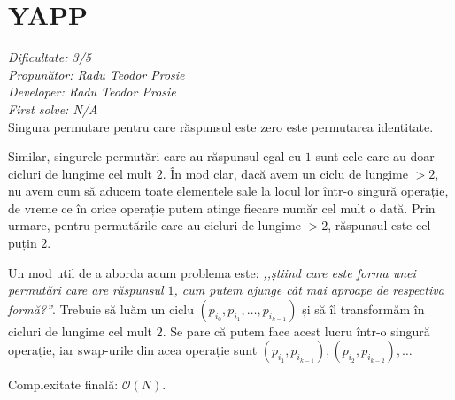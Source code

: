\section{YAPP}
\textit{Dificultate: 3/5} \\
\textit{Propunător: Radu Teodor Prosie} \\
\textit{Developer: Radu Teodor Prosie} \\
\textit{First solve: N/A}  \\

Singura permutare pentru care răspunsul este zero este permutarea identitate.

Similar, singurele permutări care au răspunsul egal cu $1$ sunt cele care au doar cicluri de lungime cel mult $2$. În mod clar, dacă avem un ciclu de lungime $> 2$, nu avem cum să aducem toate elementele sale la locul lor într-o singură operație, de vreme ce în orice operație putem atinge fiecare număr cel mult o dată. Prin urmare, pentru permutările care au cicluri de lungime $> 2$, răspunsul este cel puțin $2$.

Un mod util de a aborda acum problema este: \textit{,,știind care este forma unei permutări care are răspunsul $1$, cum putem ajunge cât mai aproape de respectiva formă?''}. Trebuie să luăm un ciclu $(p_{i_0}, p_{i_1}, \dots, p_{i_{k-1}})$ și să îl transformăm în cicluri de lungime cel mult $2$. Se pare că putem face acest lucru într-o singură operație, iar swap-urile din acea operație sunt $(p_{i_1}, p_{i_{k-1}}), (p_{i_2}, p_{i_{k-2}}), \dots$

\medskip

Complexitate finală: $\mathcal{O}(N)$.
